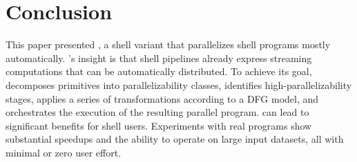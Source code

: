\documentclass[letterpaper,twocolumn,10pt]{article}
\newcommand{\km}[1]{[{\color{blue}km: #1}]}
\begin{document}
  


\section{Conclusion}
\label{discussion}

This paper presented \sys, a shell variant that parallelizes shell programs mostly automatically.
\sys's insight is that shell pipelines already express streaming computations that can be automatically distributed.
To achieve its goal, \sys
  decomposes primitives into parallelizability classes,
  identifies high-parallelizability stages,
  applies a series of transformations according to a DFG model,
  and orchestrates the execution of the resulting parallel program.
%
%
  \sys can lead to significant benefits for shell users.
Experiments with real programs show substantial speedups and the ability to operate on large input datasets, all with minimal or zero user effort.
\end{document}
